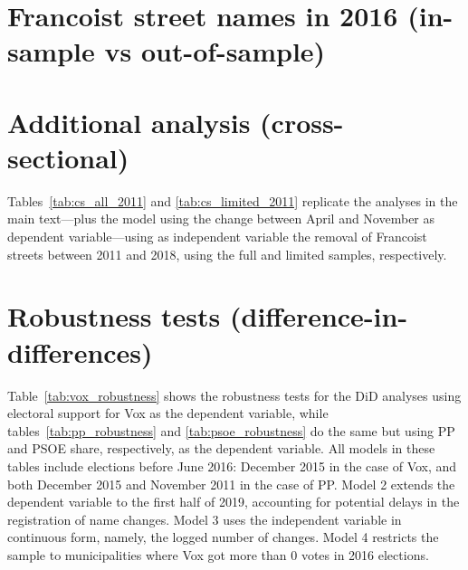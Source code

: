 \documentclass[12pt, titlepage]{article}
\begin{document}
\textbf{{\color{red}{DISCUSS MORE THIS}}}



\clearpage
\section{Francoist street names in 2016 (in-sample vs out-of-sample)}






\clearpage
\section{Additional analysis (cross-sectional)}



Tables~\ref{tab:cs_all_2011} and \ref{tab:cs_limited_2011} replicate the analyses in the main text---plus the model using the change between April and November as dependent variable---using as independent variable the removal of Francoist streets between 2011 and 2018, using the full and limited samples, respectively.




\clearpage
\section{Robustness tests (difference-in-differences)}

Table~\ref{tab:vox_robustness} shows the robustness tests for the DiD analyses using electoral support for Vox as the dependent variable, while tables~\ref{tab:pp_robustness} and \ref{tab:psoe_robustness} do the same but using PP and PSOE share, respectively, as the dependent variable.
All models in these tables include elections before June 2016: December 2015 in the case of Vox, and both December 2015 and November 2011 in the case of PP.
Model 2 extends the dependent variable to the first half of 2019, accounting for potential delays in the registration of name changes.
Model 3 uses the independent variable in continuous form, namely, the logged number of changes.
Model 4 restricts the sample to municipalities where Vox got more than 0 votes in 2016 elections.
\textbf{{\color{red}{DISCUSS}}}




\end{document}
